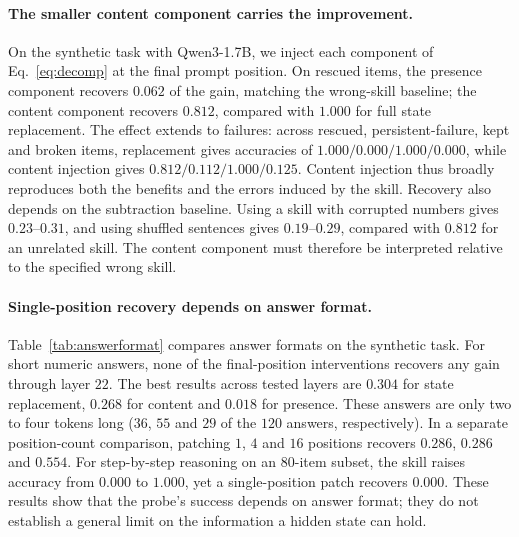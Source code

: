 \documentclass{article}
\begin{document}
\paragraph{The smaller content component carries the improvement.}
On the synthetic task with Qwen3-1.7B, we inject each component of
Eq.~\ref{eq:decomp} at the final prompt position. On rescued items, the
presence component recovers $0.062$ of the gain, matching the wrong-skill
baseline; the content component recovers $0.812$, compared with $1.000$ for
full state replacement. The effect extends to failures: across rescued,
persistent-failure, kept and broken items, replacement gives accuracies of
$1.000/0.000/1.000/0.000$, while content injection gives
$0.812/0.112/1.000/0.125$. Content injection thus broadly reproduces both the
benefits and the errors induced by the skill. Recovery also depends on the
subtraction baseline. Using a skill with corrupted numbers gives
$0.23$--$0.31$, and using shuffled sentences gives $0.19$--$0.29$, compared
with $0.812$ for an unrelated skill. The content component must therefore be
interpreted relative to the specified wrong skill.

\paragraph{Single-position recovery depends on answer format.}
\label{sec:onepos}
Table~\ref{tab:answerformat} compares answer formats on the synthetic task.
For short numeric answers, none of the final-position interventions recovers
any gain through layer $22$. The best results across tested layers are $0.304$
for state replacement, $0.268$ for content and $0.018$ for presence.
These answers are only two to four tokens long ($36$, $55$ and $29$ of the
$120$ answers, respectively). In a separate position-count comparison,
patching $1$, $4$ and $16$ positions recovers $0.286$, $0.286$ and $0.554$.
For step-by-step reasoning on an $80$-item subset, the skill raises accuracy
from $0.000$ to $1.000$, yet a single-position patch recovers $0.000$.
These results show that the probe's success depends on answer format; they do
not establish a general limit on the information a hidden state can hold.

\begin{table}[t]
\caption{Final-position state replacement across answer formats, Qwen3-8B (pre-fix).
Multiple choice and numeric answers use the same $120$ items; reasoning uses an
$80$-item subset with the same skill. Recovery is the best state-replacement
result over tested layers on each format's rescued items.}
\label{tab:answerformat}
\centering\small

\end{table}
\end{document}
